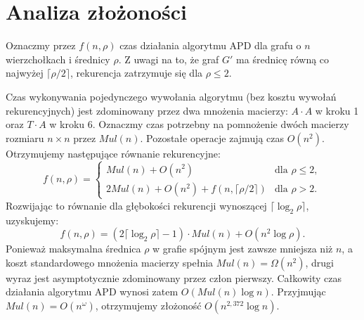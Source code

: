 \section{Analiza złożoności}

Oznaczmy przez $f(n, \rho)$ czas działania algorytmu APD dla grafu o $n$ wierzchołkach i średnicy $\rho$. Z uwagi na to, że graf $G'$ ma średnicę równą co najwyżej $\lceil \rho/2 \rceil$, rekurencja zatrzymuje się dla $\rho \leq 2$.

Czas wykonywania pojedynczego wywołania algorytmu (bez kosztu wywołań rekurencyjnych) jest zdominowany przez dwa mnożenia macierzy: $A \cdot A$ w kroku 1 oraz $T \cdot A$ w kroku 6. Oznaczmy czas potrzebny na pomnożenie dwóch macierzy rozmiaru $n \times n$ przez $Mul(n)$. Pozostałe operacje zajmują czas $O(n^2)$. Otrzymujemy następujące równanie rekurencyjne:
\[
f(n, \rho) = \begin{cases} Mul(n) + O(n^2) & \text{dla } \rho \leq 2, \\ 2Mul(n) + O(n^2) + f(n, \lceil \rho/2 \rceil) & \text{dla } \rho > 2. \end{cases}
\]
Rozwijając to równanie dla głębokości rekurencji wynoszącej $\lceil \log_2 \rho \rceil$, uzyskujemy:
\[
f(n, \rho) = (2\lceil \log_2 \rho \rceil - 1) \cdot Mul(n) + O(n^2 \log \rho).
\]
Ponieważ maksymalna średnica $\rho$ w grafie spójnym jest zawsze mniejsza niż $n$, a koszt standardowego mnożenia macierzy spełnia $Mul(n) = \Omega(n^2)$, drugi wyraz jest asymptotycznie zdominowany przez człon pierwszy. Całkowity czas działania algorytmu APD wynosi zatem $O(Mul(n) \log n)$. Przyjmując $Mul(n) = O(n^\omega)$, otrzymujemy złożoność $O(n^{2{,}372} \log n)$.


\newpage